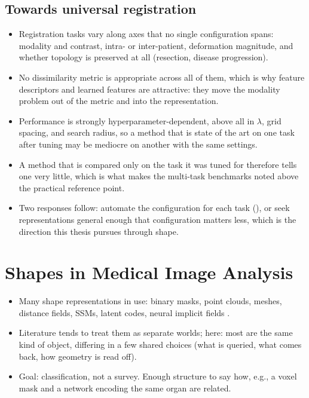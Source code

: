 \subsection{Towards universal registration}
\begin{itemize}
\item Registration tasks vary along axes that no single configuration spans: modality and contrast, intra- or inter-patient, deformation magnitude, and whether topology is preserved at all (resection, disease progression).
\item No dissimilarity metric is appropriate across all of them, which is why feature descriptors and learned features are attractive: they move the modality problem out of the metric and into the representation.
\item Performance is strongly hyperparameter-dependent, above all in $\lambda$, grid spacing, and search radius, so a method that is state of the art on one task after tuning may be mediocre on another with the same settings.
\item A method that is compared only on the task it was tuned for therefore tells one very little, which is what makes the multi-task benchmarks noted above the practical reference point.
\item Two responses follow: automate the configuration for each task (), or seek representations general enough that configuration matters less, which is the direction this thesis pursues through shape.
\end{itemize}

\section{Shapes in Medical Image Analysis} %
\label{sec:bg-shapes}

\begin{itemize}
    \item Many shape representations in use: binary masks, point clouds, meshes, distance fields, SSMs, latent codes, neural implicit fields \citep{heimann2009statistical, ambellan2019statistical}.
    \item Literature tends to treat them as separate worlds; here: most are the same kind of object, differing in a few shared choices (what is queried, what comes back, how geometry is read off).
    \item Goal: classification, not a survey. Enough structure to say how, e.g., a voxel mask and a network encoding the same organ are related.
\end{itemize}

